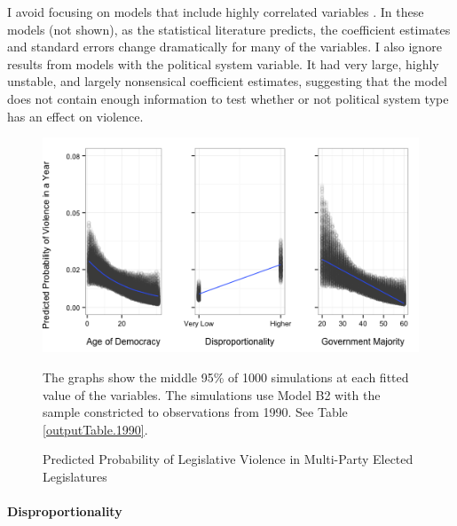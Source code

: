 \documentclass[a4paper]{article}\usepackage{graphicx, color}
\newenvironment{knitrout}{}{} %
\begin{document}
I avoid focusing on models that include highly correlated variables \citep[see][]{Achen2002, Schrodt2006}. In these models (not shown), as the statistical literature predicts, the coefficient estimates and standard errors change dramatically for many of the variables. I also ignore results from models with the political system variable. It had very large, highly unstable, and largely nonsensical coefficient estimates, suggesting that the model does not contain enough information to test \citep{Babyak2004} whether or not political system type has an effect on violence.

\begin{figure}[t]
    \caption{Predicted Probability of Legislative Violence in Multi-Party Elected Legislatures}  
    \label{pred_prob}
    \begin{center}


\begin{knitrout}
\color{fgcolor}
\includegraphics[width=0.8\linewidth]{figure/predProb} 

\end{knitrout}

    \end{center}
    \begin{singlespace}
      {\scriptsize{The graphs show the middle 95\% of 1000 simulations at each fitted value of the variables. The simulations use Model B2 with the sample constricted to observations from 1990. See Table \ref{outputTable.1990}.}}
    \end{singlespace}
\end{figure}

\paragraph{Disproportionality}
\end{document}

